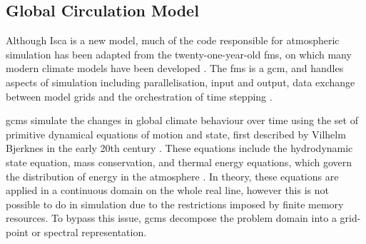 \documentclass[a4paper,11pt]{report}
\begin{document}
\subsection{Global Circulation Model}
Although Isca is a new model, much of the code responsible for atmospheric simulation has been adapted from the twenty-one-year-old \gls{fms}, on which many modern climate models have been developed \cite{balaji2002fms, donner2011dynamical, farneti2009intermediate}. The \gls{fms} is a \gls{gcm}, and handles aspects of simulation including parallelisation, input and output, data exchange between model grids and the orchestration of time stepping \cite{gfdl2019fms}.
\par
\gls{gcm}s simulate the changes in global climate behaviour over time using the set of primitive dynamical equations of motion and state, first described by Vilhelm Bjerknes in the early 20th century \cite{bjerknes1910dynamic,edwards2011history, godske1957dynamic}. These equations include the hydrodynamic state equation, mass conservation, and thermal energy equations, which govern the distribution of energy in the atmosphere \cite{vallis2018isca,edwards2011history}. In theory, these equations are applied in a continuous domain on the whole real line, however this is not possible to do in simulation due to the restrictions imposed by finite memory resources. To bypass this issue, \gls{gcm}s decompose the problem domain into a grid-point or spectral representation.
\end{document}
